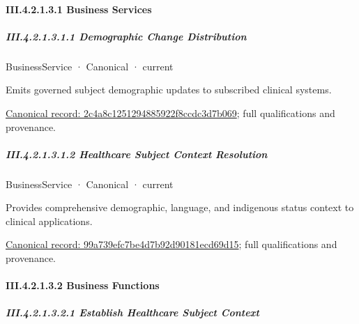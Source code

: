 \paragraph*{III.4.2.1.3.1 Business Services}
\label{navigation:III.4.2.1.3.1}

\subparagraph*{III.4.2.1.3.1.1 Demographic Change Distribution}
\label{navigation:III.4.2.1.3.1.1}

\label{element:2c4a8c1251294885922f8ccdc3d7b069}
{\small BusinessService · Canonical · current}\par

Emits governed subject demographic updates to subscribed clinical systems.


{\footnotesize \href{../../../../../../../continuum/business/business-service/2c4a8c1251294885922f8ccdc3d7b069.md}{Canonical record: 2c4a8c1251294885922f8ccdc3d7b069}; full qualifications and provenance.}\par
\subparagraph*{III.4.2.1.3.1.2 Healthcare Subject Context Resolution}
\label{navigation:III.4.2.1.3.1.2}

\label{element:99a739efc7be4d7b92d90181ecd69d15}
{\small BusinessService · Canonical · current}\par

Provides comprehensive demographic, language, and indigenous status context to clinical applications.


{\footnotesize \href{../../../../../../../continuum/business/business-service/99a739efc7be4d7b92d90181ecd69d15.md}{Canonical record: 99a739efc7be4d7b92d90181ecd69d15}; full qualifications and provenance.}\par
\paragraph*{III.4.2.1.3.2 Business Functions}
\label{navigation:III.4.2.1.3.2}

\subparagraph*{III.4.2.1.3.2.1 Establish Healthcare Subject Context}
\label{navigation:III.4.2.1.3.2.1}

